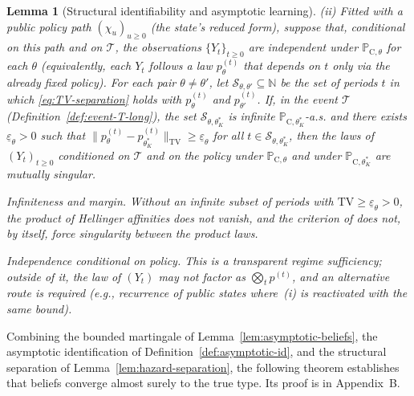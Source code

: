 \documentclass[review,authoryear,12pt]{elsarticle}
\theoremstyle{plain}
\newtheorem{lemma}[theorem]{Lemma}
\theoremstyle{definition}
\newcommand{\ProbC}[1]{\mathbb{P}_{\mathrm{C},#1}}
\newcommand{\1}{\mathbf{1}}
\begin{document}
\begin{lemma}[Structural identifiability and asymptotic learning]
\medskip
\noindent\textup{(ii)}
Fitted with a public policy path $(\chi_u)_{u\ge 0}$ \textup{(}the state's reduced form\textup{)}, suppose that, conditional on this path and on $\mathcal{T}$, the observations $\{Y_t\}_{t\ge 0}$ are independent under $\ProbC{\theta}$ for each $\theta$ \textup{(}equivalently, each $Y_t$ follows a law $p_\theta^{(t)}$ that depends on $t$ only via the already fixed policy\textup{)}. For each pair $\theta\neq\theta'$, let $\mathcal{S}_{\theta,\theta'}\subseteq\mathbb{N}$ be the set of periods $t$ in which \eqref{eq:TV-separation} holds with $p_\theta^{(t)}$ and $p_{\theta'}^{(t)}$. If, in the event $\mathcal{T}$ \textup{(}Definition~\ref{def:event-T-long}\textup{)}, the set $\mathcal{S}_{\theta,\theta_K^\ast}$ is infinite $\ProbC{\theta_K^\ast}$-a.s. and there exists $\underline{\varepsilon}_{\theta}>0$ such that $\|p_\theta^{(t)}-p_{\theta_K^\ast}^{(t)}\|_{\mathrm{TV}}\ge \underline{\varepsilon}_{\theta}$ for all $t\in\mathcal{S}_{\theta,\theta_K^\ast}$, then the laws of $(Y_t)_{t\ge 0}$ conditioned on $\mathcal{T}$ and on the policy under $\ProbC{\theta}$ and under $\ProbC{\theta_K^\ast}$ are mutually singular.

\medskip
\begin{list}{}{%
  \setlength{\leftmargin}{2.25em}%
  \setlength{\labelwidth}{2.25em}%
  \setlength{\labelsep}{0.45em}%
  \setlength{\itemsep}{0.35em}%
  \setlength{\parsep}{0pt}%
  \setlength{\topsep}{0.25em}%
}
\item[\textup{(C3)}] \textup{Infiniteness and margin.}\quad
Without an infinite subset of periods with $\mathrm{TV}\ge\underline{\varepsilon}_\theta>0$, the product of Hellinger affinities does not vanish, and the criterion of \citet{Kakutani1948} does not, by itself, force singularity between the product laws.
\item[\textup{(C4)}] \textup{Independence conditional on policy.}\quad
This is a transparent regime sufficiency; outside of it, the law of $(Y_t)$ may not factor as $\bigotimes_t p^{(t)}$, and an alternative route is required \textup{(}e.g., recurrence of public states where~\textup{(i)} is reactivated with the same bound\textup{)}.
\end{list}
\end{lemma}

Combining the bounded martingale of Lemma~\ref{lem:asymptotic-beliefs}, the asymptotic identification of Definition~\ref{def:asymptotic-id}, and the structural separation of Lemma~\ref{lem:hazard-separation}, the following theorem establishes that beliefs converge almost surely to the true type. Its proof is in Appendix~B.
\end{document}
